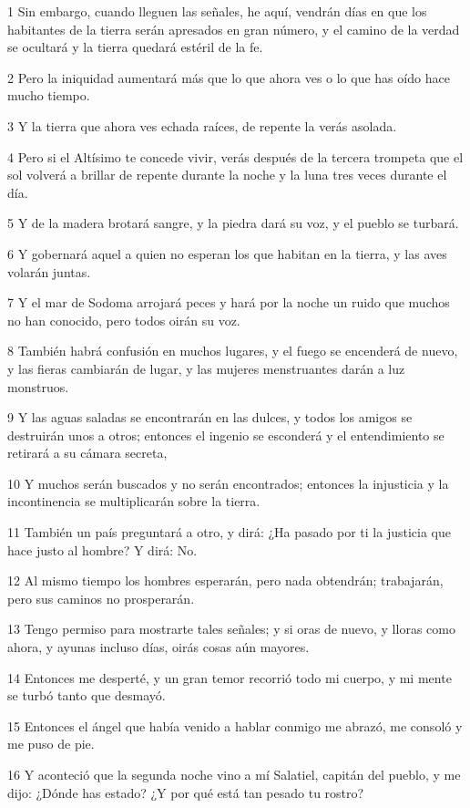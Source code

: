 \par 1 Sin embargo, cuando lleguen las señales, he aquí, vendrán días en que los habitantes de la tierra serán apresados ​​en gran número, y el camino de la verdad se ocultará y la tierra quedará estéril de la fe.
\par 2 Pero la iniquidad aumentará más que lo que ahora ves o lo que has oído hace mucho tiempo.
\par 3 Y la tierra que ahora ves echada raíces, de repente la verás asolada.
\par 4 Pero si el Altísimo te concede vivir, verás después de la tercera trompeta que el sol volverá a brillar de repente durante la noche y la luna tres veces durante el día.
\par 5 Y de la madera brotará sangre, y la piedra dará su voz, y el pueblo se turbará.
\par 6 Y gobernará aquel a quien no esperan los que habitan en la tierra, y las aves volarán juntas.
\par 7 Y el mar de Sodoma arrojará peces y hará por la noche un ruido que muchos no han conocido, pero todos oirán su voz.
\par 8 También habrá confusión en muchos lugares, y el fuego se encenderá de nuevo, y las fieras cambiarán de lugar, y las mujeres menstruantes darán a luz monstruos.
\par 9 Y las aguas saladas se encontrarán en las dulces, y todos los amigos se destruirán unos a otros; entonces el ingenio se esconderá y el entendimiento se retirará a su cámara secreta,
\par 10 Y muchos serán buscados y no serán encontrados; entonces la injusticia y la incontinencia se multiplicarán sobre la tierra.
\par 11 También un país preguntará a otro, y dirá: ¿Ha pasado por ti la justicia que hace justo al hombre? Y dirá: No.
\par 12 Al mismo tiempo los hombres esperarán, pero nada obtendrán; trabajarán, pero sus caminos no prosperarán.
\par 13 Tengo permiso para mostrarte tales señales; y si oras de nuevo, y lloras como ahora, y ayunas incluso días, oirás cosas aún mayores.
\par 14 Entonces me desperté, y un gran temor recorrió todo mi cuerpo, y mi mente se turbó tanto que desmayó.
\par 15 Entonces el ángel que había venido a hablar conmigo me abrazó, me consoló y me puso de pie.
\par 16 Y aconteció que la segunda noche vino a mí Salatiel, capitán del pueblo, y me dijo: ¿Dónde has estado? ¿Y por qué está tan pesado tu rostro?
